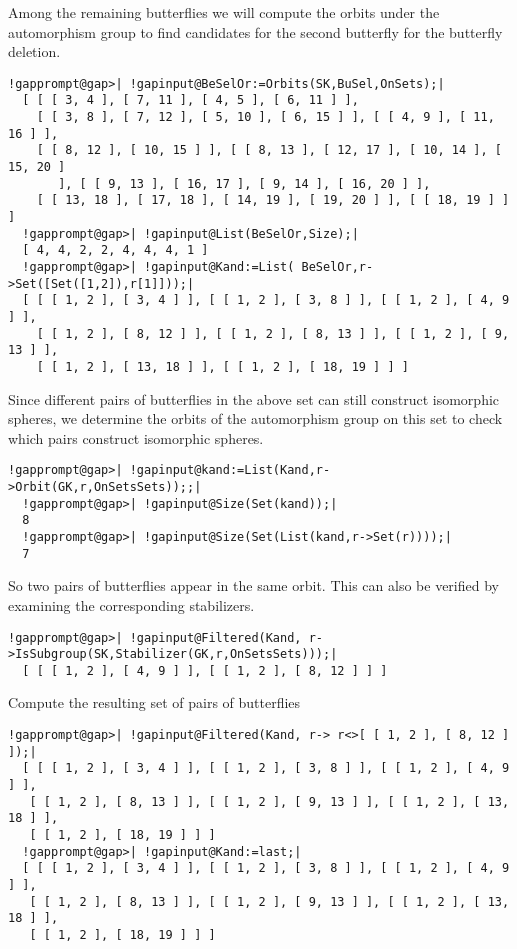 \documentclass[a4paper,11pt]{report}
\begin{document}
{{ Among the remaining butterflies we will compute the orbits under the
automorphism group to find candidates for the second butterfly for the
butterfly deletion. 

 
\begin{Verbatim}[commandchars=!@|,fontsize=\small,frame=single,label=Example]
  !gapprompt@gap>| !gapinput@BeSelOr:=Orbits(SK,BuSel,OnSets);|
  [ [ [ 3, 4 ], [ 7, 11 ], [ 4, 5 ], [ 6, 11 ] ], 
    [ [ 3, 8 ], [ 7, 12 ], [ 5, 10 ], [ 6, 15 ] ], [ [ 4, 9 ], [ 11, 16 ] ], 
    [ [ 8, 12 ], [ 10, 15 ] ], [ [ 8, 13 ], [ 12, 17 ], [ 10, 14 ], [ 15, 20 ] 
       ], [ [ 9, 13 ], [ 16, 17 ], [ 9, 14 ], [ 16, 20 ] ], 
    [ [ 13, 18 ], [ 17, 18 ], [ 14, 19 ], [ 19, 20 ] ], [ [ 18, 19 ] ] ]
  !gapprompt@gap>| !gapinput@List(BeSelOr,Size);|
  [ 4, 4, 2, 2, 4, 4, 4, 1 ]
  !gapprompt@gap>| !gapinput@Kand:=List( BeSelOr,r->Set([Set([1,2]),r[1]]));|
  [ [ [ 1, 2 ], [ 3, 4 ] ], [ [ 1, 2 ], [ 3, 8 ] ], [ [ 1, 2 ], [ 4, 9 ] ], 
    [ [ 1, 2 ], [ 8, 12 ] ], [ [ 1, 2 ], [ 8, 13 ] ], [ [ 1, 2 ], [ 9, 13 ] ], 
    [ [ 1, 2 ], [ 13, 18 ] ], [ [ 1, 2 ], [ 18, 19 ] ] ]
\end{Verbatim}
 

 Since different pairs of butterflies in the above set can still construct
isomorphic spheres, we determine the orbits of the automorphism group on this
set to check which pairs construct isomorphic spheres. 

 
\begin{Verbatim}[commandchars=!@|,fontsize=\small,frame=single,label=Example]
  !gapprompt@gap>| !gapinput@kand:=List(Kand,r->Orbit(GK,r,OnSetsSets));;|
  !gapprompt@gap>| !gapinput@Size(Set(kand));|
  8
  !gapprompt@gap>| !gapinput@Size(Set(List(kand,r->Set(r))));|
  7
\end{Verbatim}
 

 So two pairs of butterflies appear in the same orbit. This can also be
verified by examining the corresponding stabilizers. 

 
\begin{Verbatim}[commandchars=!@|,fontsize=\small,frame=single,label=Example]
  !gapprompt@gap>| !gapinput@Filtered(Kand, r->IsSubgroup(SK,Stabilizer(GK,r,OnSetsSets)));|
  [ [ [ 1, 2 ], [ 4, 9 ] ], [ [ 1, 2 ], [ 8, 12 ] ] ]
\end{Verbatim}
 

 Compute the resulting set of pairs of butterflies 

 
\begin{Verbatim}[commandchars=!@|,fontsize=\small,frame=single,label=Example]
  !gapprompt@gap>| !gapinput@Filtered(Kand, r-> r<>[ [ 1, 2 ], [ 8, 12 ] ]);|
  [ [ [ 1, 2 ], [ 3, 4 ] ], [ [ 1, 2 ], [ 3, 8 ] ], [ [ 1, 2 ], [ 4, 9 ] ], 
   [ [ 1, 2 ], [ 8, 13 ] ], [ [ 1, 2 ], [ 9, 13 ] ], [ [ 1, 2 ], [ 13, 18 ] ],
   [ [ 1, 2 ], [ 18, 19 ] ] ]
  !gapprompt@gap>| !gapinput@Kand:=last;|
  [ [ [ 1, 2 ], [ 3, 4 ] ], [ [ 1, 2 ], [ 3, 8 ] ], [ [ 1, 2 ], [ 4, 9 ] ], 
   [ [ 1, 2 ], [ 8, 13 ] ], [ [ 1, 2 ], [ 9, 13 ] ], [ [ 1, 2 ], [ 13, 18 ] ],
   [ [ 1, 2 ], [ 18, 19 ] ] ]
\end{Verbatim}
 

}}
\end{document}
